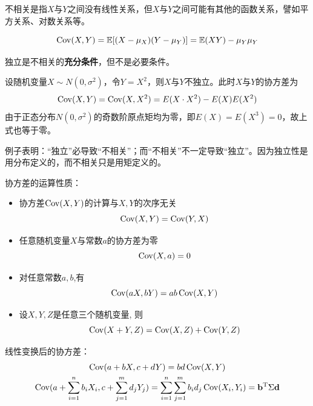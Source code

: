 \begin{remark}
    不相关是指$X$与$Y$之间没有线性关系，但$X$与$Y$之间可能有其他的函数关系，譬如平方关系、对数关系等。
\end{remark}

\begin{proposition}
    \[ \operatorname{Cov}(X,Y)=\mathbb{E}[(X-\mu_X)(Y-\mu_Y)]=\mathbb{E}(XY)-\mu_Y \mu_Y \]
\end{proposition}

\begin{proposition}
    独立是不相关的\textbf{充分条件}，但不是必要条件。
\end{proposition}
\begin{example}\label{exam:3.4.6}
    设随机变量$X \sim N(0,\sigma^2)$，令$Y=X^2$，则$X$与$Y$不独立。此时$X$与$Y$的协方差为
    \[ \operatorname{Cov}(X, Y)=\operatorname{Cov}(X, X^2)=E(X\cdot X^2)-E(X)E(X^2) \]
    由于正态分布$N(0,\sigma^2)$的奇数阶原点矩均为零，即$E(X)=E(X^3)=0$，故上式也等于零。

    例子表明：“独立”必导致“不相关”；而“不相关”不一定导致“独立”。因为独立性是用分布定义的，而不相关只是用矩定义的。
\end{example}

\begin{proposition}\label{prop:cov_property}
    协方差的运算性质：
    \begin{itemize}
        \item 协方差$\operatorname{Cov}(X,Y)$的计算与$X,Y$的次序无关
              \[ \operatorname{Cov}(X,Y)=\operatorname{Cov}(Y,X) \]
        \item 任意随机变量$X$与常数$a$的协方差为零
              \[ \operatorname{Cov}(X,a)=0 \]
        \item 对任意常数$a,b$,有
              \[ \operatorname{Cov}(a X, b Y)=a b \operatorname{Cov}(X, Y) \]
        \item 设$X,Y,Z$是任意三个随机变量, 则
              \[ \operatorname{Cov}(X+Y, Z)=\operatorname{Cov}(X, Z)+\operatorname{Cov}(Y, Z) \]
    \end{itemize}
\end{proposition}

\begin{corollary}
    线性变换后的协方差：
    \begin{gather*}
        \operatorname{Cov}(a+ b X,c +d Y)  = b d \operatorname{Cov}(X,Y)\\
        \operatorname{Cov}(a+\sum_{i=1}^n b_i X_i,c+\sum_{j=1}^m d_j Y_j) = \sum_{i=1}^n\sum_{j=1}^m b_i d_j \operatorname{Cov}(X_i,Y_i) = \mathbf{b}^{\mathrm{T}}\Sigma \mathbf{d}
    \end{gather*}
\end{corollary}

